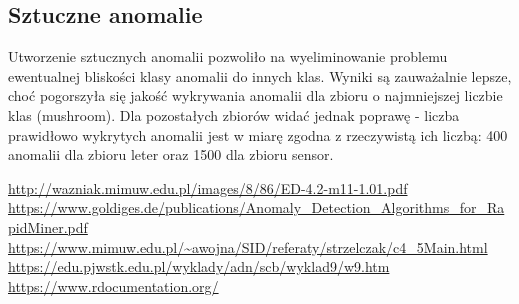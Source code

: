 \documentclass[11pt,a4paper,twoside]{article}
\begin{document}
\subsection {Sztuczne anomalie}

Utworzenie sztucznych anomalii pozwoliło na wyeliminowanie problemu ewentualnej bliskości klasy anomalii do innych klas. Wyniki są zauważalnie lepsze, choć pogorszyła się jakość wykrywania anomalii dla zbioru o najmniejszej liczbie klas (mushroom). Dla pozostałych zbiorów widać jednak poprawę - liczba prawidłowo wykrytych anomalii jest w miarę zgodna z rzeczywistą ich liczbą: 400 anomalii dla zbioru leter oraz 1500 dla zbioru sensor.



\begin{thebibliography}{9}
\url{http://wazniak.mimuw.edu.pl/images/8/86/ED-4.2-m11-1.01.pdf}
\url{https://www.goldiges.de/publications/Anomaly_Detection_Algorithms_for_RapidMiner.pdf}
\url{https://www.mimuw.edu.pl/~awojna/SID/referaty/strzelczak/c4_5Main.html}
\url{https://edu.pjwstk.edu.pl/wyklady/adn/scb/wyklad9/w9.htm}
\url{https://www.rdocumentation.org/}


\end{thebibliography}
\end{document}
